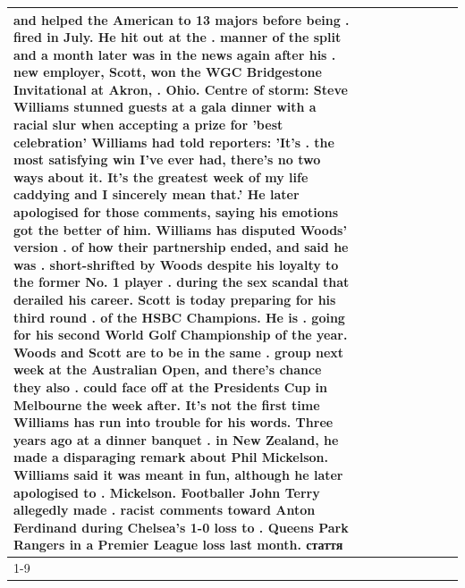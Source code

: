\begin{table}[H]
\begin{tabular}{lllrlllll}
and helped the American to 13 majors before being . fired in July. He hit out at the . manner of the split and a month later was in the news again after his . new employer, Scott, won the WGC Bridgestone Invitational at Akron, . Ohio. Centre of storm: Steve Williams stunned guests at a gala dinner with a racial slur when accepting a prize for 'best celebration' Williams had told reporters: 'It's . the most satisfying win I've ever had, there's no two ways about it. It's the greatest week of my life caddying and I sincerely mean that.' He later apologised for those comments, saying his emotions got the better of him. Williams has disputed Woods' version . of how their partnership ended, and said he was . short-shrifted by Woods despite his loyalty to the former No. 1 player . during the sex scandal that derailed his career. Scott is today preparing for his third round . of the HSBC Champions. He is . going for his second World Golf Championship of the year. Woods and Scott are to be in the same . group next week at the Australian Open, and there's chance they also . could face off at the Presidents Cup in Melbourne the week after. It's not the first time Williams has run into trouble for his words. Three years ago at a dinner banquet . in New Zealand, he made a disparaging remark about Phil Mickelson. Williams said it was meant in fun, although he later apologised to . Mickelson. Footballer John Terry allegedly made . racist comments toward Anton Ferdinand during Chelsea's 1-0 loss to . Queens Park Rangers in a Premier League loss last month. стаття \\
\cline{1-9}

\end{tabular}
\end{table}
